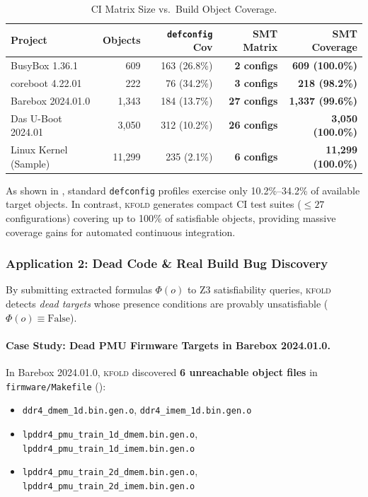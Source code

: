 \documentclass[acmsmall,screen,review]{acmart}
\newcommand{\tool}{\textsc{kfold}\xspace}
\begin{document}
\begin{table}[t]
\centering
\footnotesize
\setlength{\tabcolsep}{4pt}
\caption{CI Matrix Size vs.\ Build Object Coverage.}
\label{tab:ci}
\begin{tabular}{lrrrr}
\toprule
\textbf{Project} & \textbf{Objects} & \textbf{\texttt{defconfig} Cov} & \textbf{SMT Matrix} & \textbf{SMT Coverage} \\
\midrule
BusyBox 1.36.1 & 609 & 163 (26.8\%) & \textbf{2 configs} & \textbf{609 (100.0\%)} \\
coreboot 4.22.01 & 222 & 76 (34.2\%) & \textbf{3 configs} & \textbf{218 (98.2\%)} \\
Barebox 2024.01.0 & 1,343 & 184 (13.7\%) & \textbf{27 configs} & \textbf{1,337 (99.6\%)} \\
Das U-Boot 2024.01 & 3,050 & 312 (10.2\%) & \textbf{26 configs} & \textbf{3,050 (100.0\%)} \\
Linux Kernel (Sample) & 11,299 & 235 (2.1\%) & \textbf{6 configs} & \textbf{11,299 (100.0\%)} \\
\bottomrule
\end{tabular}
\end{table}

As shown in , standard \texttt{defconfig} profiles exercise only 10.2\%--34.2\% of available target objects. In contrast, \tool generates compact CI test suites ($\le 27$ configurations) covering up to 100\% of satisfiable objects, providing massive coverage gains for automated continuous integration.

\subsubsection{Application 2: Dead Code \& Real Build Bug Discovery}
By submitting extracted formulas $\Phi(o)$ to Z3 satisfiability queries, \tool detects \emph{dead targets} whose presence conditions are provably unsatisfiable ($\Phi(o) \equiv \text{False}$).

\paragraph{Case Study: Dead PMU Firmware Targets in Barebox 2024.01.0.}
In Barebox 2024.01.0, \tool discovered \textbf{6 unreachable object files} in \texttt{firmware/Makefile} ():
\begin{itemize}
\item \texttt{ddr4\_dmem\_1d.bin.gen.o}, \texttt{ddr4\_imem\_1d.bin.gen.o}
\item \texttt{lpddr4\_pmu\_train\_1d\_dmem.bin.gen.o}, \texttt{lpddr4\_pmu\_train\_1d\_imem.bin.gen.o}
\item \texttt{lpddr4\_pmu\_train\_2d\_dmem.bin.gen.o}, \texttt{lpddr4\_pmu\_train\_2d\_imem.bin.gen.o}
\end{itemize}
\end{document}

